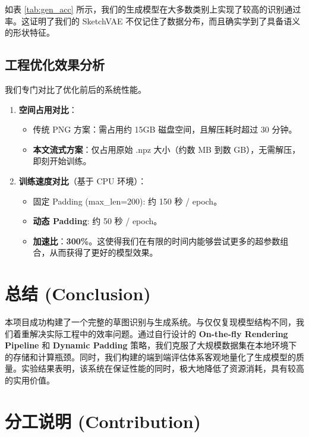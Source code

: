 \documentclass{sjtuarticle}
\begin{document}
如表 \ref{tab:gen_acc} 所示，我们的生成模型在大多数类别上实现了较高的识别通过率。这证明了我们的 SketchVAE 不仅记住了数据分布，而且确实学到了具备语义的形状特征。

\subsection{工程优化效果分析}
我们专门对比了优化前后的系统性能。

\begin{enumerate}
    \item \textbf{空间占用对比}：
    \begin{itemize}
        \item 传统 PNG 方案：需占用约 15GB 磁盘空间，且解压耗时超过 30 分钟。
        \item \textbf{本文流式方案}：仅占用原始 .npz 大小（约数 MB 到数 GB），无需解压，即刻开始训练。
    \end{itemize}
    
    \item \textbf{训练速度对比}（基于 CPU 环境）：
    \begin{itemize}
        \item 固定 Padding (max\_len=200): 约 150 秒 / epoch。
        \item \textbf{动态 Padding}: 约 50 秒 / epoch。
        \item \textbf{加速比}：\textbf{300\%}。这使得我们在有限的时间内能够尝试更多的超参数组合，从而获得了更好的模型效果。
    \end{itemize}
\end{enumerate}

\section{总结 (Conclusion)}

本项目成功构建了一个完整的草图识别与生成系统。与仅仅复现模型结构不同，我们着重解决实际工程中的效率问题。通过自行设计的 \textbf{On-the-fly Rendering Pipeline} 和 \textbf{Dynamic Padding} 策略，我们克服了大规模数据集在本地环境下的存储和计算瓶颈。同时，我们构建的端到端评估体系客观地量化了生成模型的质量。实验结果表明，该系统在保证性能的同时，极大地降低了资源消耗，具有较高的实用价值。

\section{分工说明 (Contribution)}
\end{document}
